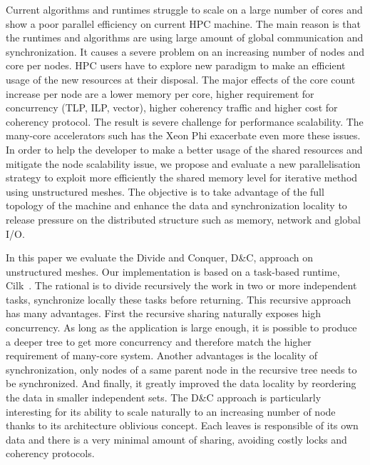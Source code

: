 \documentclass{IOS-Book-Article}
\begin{document}
Current algorithms and runtimes struggle to scale on a large number of cores and show a poor parallel efficiency on current HPC machine. The main reason is that the runtimes
and algorithms are using large amount of global communication and synchronization. It causes a severe problem on an increasing number of nodes and core per nodes.
HPC users have to explore new paradigm to make an efficient usage of the new resources at their disposal. 
The major effects of the core count increase per node are a lower memory per core, higher requirement for concurrency (TLP, ILP, vector), higher coherency traffic and higher
cost for coherency protocol. The result is severe challenge for performance scalability. The many-core accelerators such has the Xeon Phi exacerbate even more these issues. 
In order to help the developer to make a better usage of the shared resources and mitigate the node scalability issue, we propose and evaluate a new parallelisation strategy 
to exploit more efficiently the shared memory level for iterative method using unstructured meshes. The objective is to take advantage of the full topology of the machine and
enhance the data and synchronization locality to release pressure on the distributed structure such as memory, network and global I/O. 

In this paper we evaluate the Divide and Conquer, D\&C, approach on  unstructured meshes. Our implementation is based on a task-based runtime, Cilk~\cite{cilk5}.
The rational is to divide recursively the work in two or more independent tasks, synchronize locally these tasks before returning. This recursive approach has many advantages.
First the recursive sharing naturally exposes high concurrency. As long as the application is large enough, it is possible to produce a deeper tree to get more concurrency
and therefore match the higher requirement of many-core system. Another advantages is the locality of synchronization, only nodes of a same parent node in the recursive
tree needs to be synchronized. And finally, it greatly improved the data locality by reordering the data in smaller independent sets. The D\&C approach is particularly
interesting for its ability to scale naturally to an increasing number of node thanks to its architecture oblivious concept.
Each leaves is responsible of its own data and there is a very minimal amount of sharing, avoiding costly locks and coherency protocols. 
\end{document}
